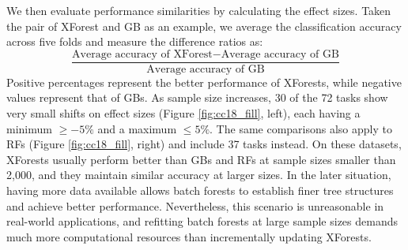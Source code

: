 
We then evaluate performance similarities by calculating the effect sizes. Taken the pair of XForest and GB as an example, we average the classification accuracy across five folds and measure the difference ratios as:
\begin{equation*} \frac{\text{Average accuracy of XForest} - \text{Average accuracy of GB}}{\text{Average accuracy of GB}} \tag{2} \end{equation*}
Positive percentages represent the better performance of XForests, while negative values represent that of GBs. 
As sample size increases, 30 of the 72 tasks show very small shifts on effect sizes (Figure \ref{fig:cc18_fill}, left), each having a minimum $\geq -5\%$ and a maximum $\leq 5\%$. The same comparisons also apply to RFs (Figure \ref{fig:cc18_fill}, right) and include 37 tasks instead. 
On these datasets, XForests usually perform better than GBs and RFs at sample sizes smaller than 2,000, and they maintain similar accuracy at larger sizes. 
In the later situation, having more data available allows batch forests to establish finer tree structures and achieve better performance. 
Nevertheless, this scenario is unreasonable in real-world applications, and refitting batch forests at large sample sizes demands much more computational resources than incrementally updating XForests.

